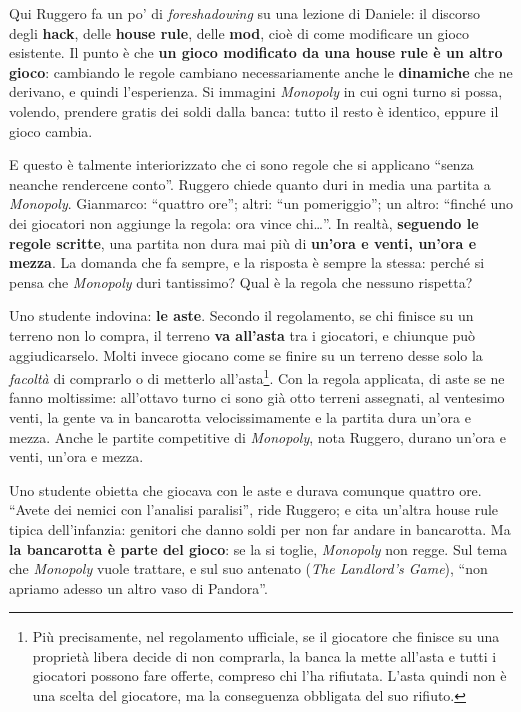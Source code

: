 Qui Ruggero fa un po' di \emph{foreshadowing} su una lezione di Daniele: il
discorso degli \textbf{hack}, delle \textbf{house rule}, delle \textbf{mod},
cioè di come modificare un gioco esistente. Il punto è che \textbf{un gioco
modificato da una house rule è un altro gioco}: cambiando le regole cambiano
necessariamente anche le \textbf{dinamiche} che ne derivano, e quindi
l'esperienza. Si immagini \emph{Monopoly} in cui ogni turno si possa, volendo,
prendere gratis dei soldi dalla banca: tutto il resto è identico, eppure il gioco
cambia.

E questo è talmente interiorizzato che ci sono regole che si applicano ``senza
neanche rendercene conto''. Ruggero chiede quanto duri in media una partita a
\emph{Monopoly}. Gianmarco: ``quattro ore''; altri: ``un pomeriggio''; un altro:
``finché uno dei giocatori non aggiunge la regola: ora vince chi\ldots''. In
realtà, \textbf{seguendo le regole scritte}, una partita non dura mai più di
\textbf{un'ora e venti, un'ora e mezza}. La domanda che fa sempre, e la risposta
è sempre la stessa: perché si pensa che \emph{Monopoly} duri tantissimo? Qual è
la regola che nessuno rispetta?

Uno studente indovina: \textbf{le aste}. Secondo il regolamento, se chi finisce
su un terreno non lo compra, il terreno \textbf{va all'asta} tra i giocatori, e
chiunque può aggiudicarselo. Molti invece giocano come se finire su un terreno
desse solo la \emph{facoltà} di comprarlo o di metterlo all'asta\footnote{Più
precisamente, nel regolamento ufficiale, se il giocatore che finisce su una
proprietà libera decide di non comprarla, la banca la mette all'asta e tutti i
giocatori possono fare offerte, compreso chi l'ha rifiutata. L'asta quindi non è
una scelta del giocatore, ma la conseguenza obbligata del suo rifiuto.}. Con la
regola applicata, di aste se ne fanno moltissime: all'ottavo turno ci sono già
otto terreni assegnati, al ventesimo venti, la gente va in bancarotta
velocissimamente e la partita dura un'ora e mezza. Anche le partite competitive
di \emph{Monopoly}, nota Ruggero, durano un'ora e venti, un'ora e mezza.

Uno studente obietta che giocava con le aste e durava comunque quattro ore.
``Avete dei nemici con l'analisi paralisi'', ride Ruggero; e cita un'altra house
rule tipica dell'infanzia: genitori che danno soldi per non far andare in
bancarotta. Ma \textbf{la bancarotta è parte del gioco}: se la si toglie,
\emph{Monopoly} non regge. Sul tema che \emph{Monopoly} vuole trattare, e sul
suo antenato (\emph{The Landlord's Game}), ``non apriamo adesso un altro vaso di
Pandora''.

